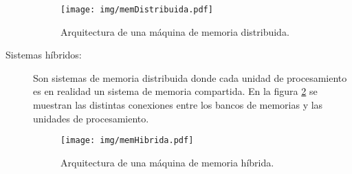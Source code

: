 \begin{description}
\begin{figure}[!htb]

	\centering
	\texttt{[image: img/memDistribuida.pdf]}
	\caption{Arquitectura de una máquina de memoria distribuida.}

	\label{memDistribuida}

\end{figure}


	\item[Sistemas híbridos:] Son sistemas de memoria distribuida donde
		cada unidad de procesamiento es en realidad un sistema de
		memoria compartida. En la figura \ref{memHibrida} se muestran las
		distintas conexiones entre los bancos de memorias y las unidades
		de procesamiento.

\begin{figure}[!htb]

	\centering
	\texttt{[image: img/memHibrida.pdf]}
	\caption{Arquitectura de una máquina de memoria híbrida.}

	\label{memHibrida}

\end{figure}

\end{description}
